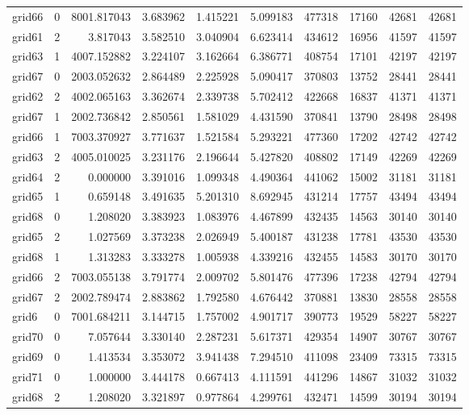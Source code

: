 \begin{longtable}{|l|r|r|r|r|r|r|r|r|r|}
grid66 & 0 & 8001.817043 & 3.683962 & 1.415221 & 5.099183 & 477318 & 17160 & 42681 & 42681 \\
grid61 & 2 & 3.817043 & 3.582510 & 3.040904 & 6.623414 & 434612 & 16956 & 41597 & 41597 \\
grid63 & 1 & 4007.152882 & 3.224107 & 3.162664 & 6.386771 & 408754 & 17101 & 42197 & 42197 \\
grid67 & 0 & 2003.052632 & 2.864489 & 2.225928 & 5.090417 & 370803 & 13752 & 28441 & 28441 \\
grid62 & 2 & 4002.065163 & 3.362674 & 2.339738 & 5.702412 & 422668 & 16837 & 41371 & 41371 \\
grid67 & 1 & 2002.736842 & 2.850561 & 1.581029 & 4.431590 & 370841 & 13790 & 28498 & 28498 \\
grid66 & 1 & 7003.370927 & 3.771637 & 1.521584 & 5.293221 & 477360 & 17202 & 42742 & 42742 \\
grid63 & 2 & 4005.010025 & 3.231176 & 2.196644 & 5.427820 & 408802 & 17149 & 42269 & 42269 \\
grid64 & 2 & 0.000000 & 3.391016 & 1.099348 & 4.490364 & 441062 & 15002 & 31181 & 31181 \\
grid65 & 1 & 0.659148 & 3.491635 & 5.201310 & 8.692945 & 431214 & 17757 & 43494 & 43494 \\
grid68 & 0 & 1.208020 & 3.383923 & 1.083976 & 4.467899 & 432435 & 14563 & 30140 & 30140 \\
grid65 & 2 & 1.027569 & 3.373238 & 2.026949 & 5.400187 & 431238 & 17781 & 43530 & 43530 \\
grid68 & 1 & 1.313283 & 3.333278 & 1.005938 & 4.339216 & 432455 & 14583 & 30170 & 30170 \\
grid66 & 2 & 7003.055138 & 3.791774 & 2.009702 & 5.801476 & 477396 & 17238 & 42794 & 42794 \\
grid67 & 2 & 2002.789474 & 2.883862 & 1.792580 & 4.676442 & 370881 & 13830 & 28558 & 28558 \\
grid6 & 0 & 7001.684211 & 3.144715 & 1.757002 & 4.901717 & 390773 & 19529 & 58227 & 58227 \\
grid70 & 0 & 7.057644 & 3.330140 & 2.287231 & 5.617371 & 429354 & 14907 & 30767 & 30767 \\
grid69 & 0 & 1.413534 & 3.353072 & 3.941438 & 7.294510 & 411098 & 23409 & 73315 & 73315 \\
grid71 & 0 & 1.000000 & 3.444178 & 0.667413 & 4.111591 & 441296 & 14867 & 31032 & 31032 \\
grid68 & 2 & 1.208020 & 3.321897 & 0.977864 & 4.299761 & 432471 & 14599 & 30194 & 30194 \\

\end{longtable}

